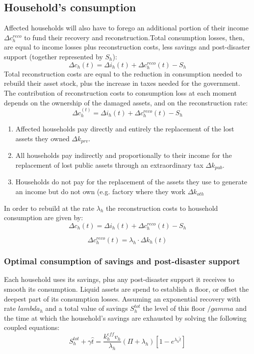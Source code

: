\documentclass{article}
\begin{document}
\subsection{Household's consumption}
Affected households will also have to forego an additional portion of their income $\Delta c_h^{reco}$ to fund their recovery and reconstruction.Total consumption losses, then, are equal to income losses plus reconstruction costs, less savings and post-disaster support (together represented by $S_h$):
\begin{equation}
\label{eq:kh}
\Delta c_h(t) = \Delta i_h(t) + \Delta c_h^{reco}(t)-S_h
\end{equation}
Total reconstruction costs are equal to the reduction in consumption needed to rebuild their asset stock, plus the increase in taxes needed for the government. The contribution of reconstruction costs to consumption loss at each moment depends on the ownership of the damaged assets, and on the reconstruction rate:
\begin{equation}
\label{eq:kh}
\Delta c_h^(t) = \Delta i_h(t) + \Delta c_h^{reco}(t)-S_h
\end{equation}

\begin{enumerate}
	\item Affected households pay directly and entirely the replacement of the lost assets they owned $\Delta k_{prv}$.
	\item All households pay indirectly and proportionally to their income for the replacement of lost public assets through an extraordinary tax $\Delta k_{pub}$.
	\item Households do not pay for the replacement of the assets they use to generate an income but do not own (e.g. factory where they work $\Delta k_{oth}$	
\end{enumerate}
In order to rebuild at the rate $\lambda_h$ the reconstruction costs to household consumption are given by:
\begin{equation}
\label{eq:kh}
\Delta c_h(t) = \Delta i_h(t) + \Delta c_h^{reco}(t)-S_h
\end{equation}

\begin{equation}
\label{eq:kh}
\Delta c_h^{reco}(t) = \lambda_h \cdot \Delta k_h (t)
\end{equation}

\subsubsection{Optimal consumption of savings and post-disaster support}
Each household uses its savings, plus any post-disaster support it receives to smooth its consumption. Liquid assets are spend to establish a floor, or offset the deepest part of its consumption losses. Assuming an exponential recovery with rate $lambda_h$ and a total value of savings $S_h^{tot}$ the level of this floor $/gamma$ and the time at which the household's savings are exhausted by solving the following coupled equations:
\begin{equation}
\label{eq:kh}
S_h^{tot} + \gamma \hat{t}= \frac{k_h^{eff}v_h}{\lambda_h}(\Pi + \lambda_h)[1-e^{\lambda_h \hat{t}}]
\end{equation}
\end{document}
